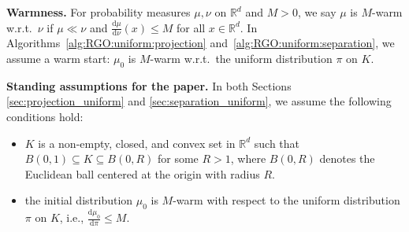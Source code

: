 \documentclass[11pt,letterpaper]{article}
\newcommand{\R}{\mathbb{R}}
\newcommand{\D}{\mathrm{d}}
\begin{document}
\textbf{Warmness.} For probability measures $\mu,\nu$ on $\R^d$ and $M>0$, we say $\mu$ is $M$-warm w.r.t.\ $\nu$ if $\mu\ll\nu$ and $\frac{\D\mu}{\D\nu}(x)\le M$ for all $x\in\R^d$. In Algorithms~\ref{alg:RGO:uniform:projection} and~\ref{alg:RGO:uniform:separation}, we assume a warm start: $\mu_0$ is $M$-warm w.r.t.\ the uniform distribution $\pi$ on $K$.




\textbf{Standing assumptions for the paper.} In both Sections \ref{sec:projection_uniform} and \ref{sec:separation_uniform}, we assume the following conditions hold:
\begin{itemize}
\item[(A1)] $K$ is a non-empty, closed, and convex set in $\R^d$ such that $B(0,1) \subseteq K \subseteq B(0,R)$ for some $R>1$, where $B(0,R)$ denotes the Euclidean ball centered at the origin with radius $R$. 
    \item[(A2)] the initial distribution $\mu_0$ is $M$-warm with respect to the uniform distribution $\pi$ on $K$, i.e., $\frac{\D\mu_0}{\D \pi}\leq M$.
\end{itemize}
\end{document}
